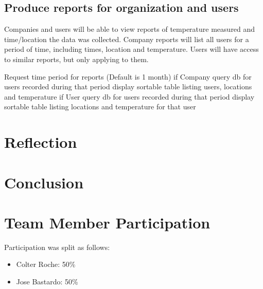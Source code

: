 \documentclass[12pt, letterpaper]{article}
\begin{document}
    \subsection{Produce reports for organization and users}
    Companies and users will be able to view reports of temperature measured and time/location the data was collected.
    Company reports will list all users for a period of time, including times, location and temperature.  Users will have
    access to similar reports, but only applying to them.
    \begin{algorithm}
        Request time period for reports (Default is 1 month)
        if Company
            query db for users recorded during that period
            display sortable table listing users, locations and temperature
        if User
            query db for users recorded during that period
            display sortable table listing locations and temperature for that user
    \end{algorithm}
    \section{Reflection}
    \section{Conclusion}
    \section{Team Member Participation}
    Participation was split as follows:
    \begin{itemize}
        \item Colter Roche: 50\%
        \item Jose Bastardo: 50\%
    \end{itemize}
\end{document}
